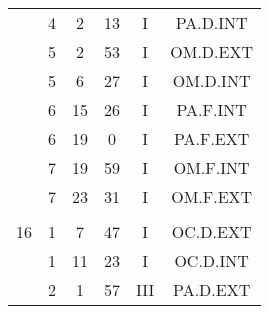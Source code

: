 \documentclass[12pt, a4paper]{article}
\begin{document}
\begin{multicols}{3}
{\begin{tabular}{c c c c c c}
	 	 	 	 & 4 & 2 & 13 & I & PA.D.INT\\%
	 	 	 	 & 5 & 2 & 53 & I & OM.D.EXT\\%
	 	 	 	 & 5 & 6 & 27 & I & OM.D.INT\\%
	 	 	 	 & 6 & 15 & 26 & I & PA.F.INT\\%
	 	 	 	 & 6 & 19 & 0 & I & PA.F.EXT\\%
	 	 	 	 & 7 & 19 & 59 & I & OM.F.INT\\%
	 	 	 	 & 7 & 23 & 31 & I & OM.F.EXT\\%
	 	 	 	 & & & & & \\%
	 	 	 	16 & 1 & 7 & 47 & I & OC.D.EXT\\%
	 	 	 	 & 1 & 11 & 23 & I & OC.D.INT\\%
	 	 	 	 & 2 & 1 & 57 & III & PA.D.EXT\\%
	 	 \end{tabular}
 	}
\end{multicols}
\end{document}
